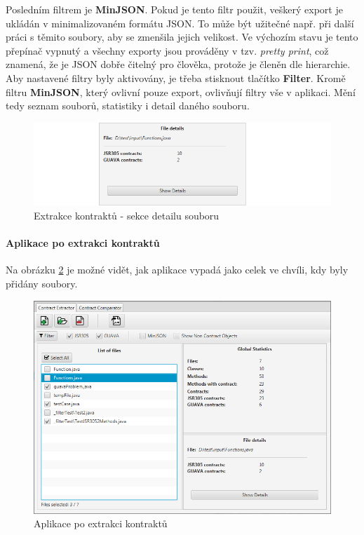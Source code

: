 			Posledním filtrem je \textbf{MinJSON}. Pokud je tento filtr použit, veškerý export je ukládán v minimalizovaném formátu JSON. To může být užitečné např. při další práci s těmito soubory, aby se zmenšila jejich velikost. Ve výchozím stavu je tento přepínač vypnutý a všechny exporty jsou prováděny v tzv. \emph{pretty print}, což znamená, že je JSON dobře čitelný pro člověka, protože je členěn dle hierarchie.\\
			
			Aby nastavené filtry byly aktivovány, je třeba stisknout tlačítko \textbf{Filter}. Kromě filtru \textbf{MinJSON}, který ovlivní pouze export, ovlivňují filtry vše v aplikaci. Mění tedy seznam souborů, statistiky i detail daného souboru.
			
			\begin{figure}[!htb]
					\centering
					\includegraphics[width=1\textwidth]{img/guide04.png}
					\caption[guide04]{Extrakce kontraktů - sekce detailu souboru}
					\label{guide04}
				\endminipage\hfill
			\end{figure}
			
				\paragraph{Aplikace po extrakci kontraktů}
					Na obrázku \ref{guide09} je možné vidět, jak aplikace vypadá jako celek ve chvíli, kdy byly přidány soubory.
					
			\begin{figure}[!htb]
					\centering
					\includegraphics[width=1\textwidth]{img/guide09.png}
					\caption[guide09]{Aplikace po extrakci kontraktů}
					\label{guide09}
				\endminipage\hfill
			\end{figure}						
			
